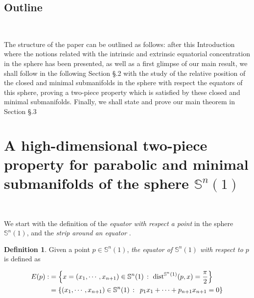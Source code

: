\documentclass{amsart}
\theoremstyle{definition}
\newtheorem{definition}[theorem]{Definition}
\theoremstyle{remark}
\newcommand{\ese}{\mathbb{S}}
\providecommand{\DIFaddend}{} %
\begin{document}
\DIFaddend %
\subsection{Outline}\

The structure of the paper can be outlined as follows: after this Introduction where the notions related with the intrinsic and extrinsic equatorial concentration in the sphere has been presented, as well as a first glimpse of our main result, we shall follow in the following Section \S.2 with the study of the relative position of the closed and minimal submanifolds in the sphere with respect the equators of this sphere, proving a two-piece property which is satisfied by these closed and minimal submanifolds. Finally, we shall state and prove our main theorem in Section \S.3





\section{A high-dimensional two-piece property for parabolic and minimal submanifolds of the sphere $\mathbb{S}^n(1)$ }\


We start with the definition of the {\em equator with respect a point} in the sphere $\ese^n(1)$, and the {\em strip around an equator }.

\begin{definition}
Given a point $p \in \mathbb{S}^n(1)$, \emph{the equator of  $\mathbb{S}^n(1)$ with respect to $p$} is defined as 

  $$
    \begin{aligned}
E(p):&=\left\{x=(x_1,\cdots,x_{n+1})\in \mathbb{S}^n(1)\, :\,\,{\rm dist}^{\mathbb{S}^n(1)}(p,x)=\frac{\pi}{2} \right\}\\&=
\left\{(x_1,\cdots,x_{n+1})\in \mathbb{S}^n(1)\, : \,\,\, p_1x_1+\cdots+p_{n+1}x_{n+1}=0\right\}
\end{aligned}
    $$
    \end{definition}
\end{document}

